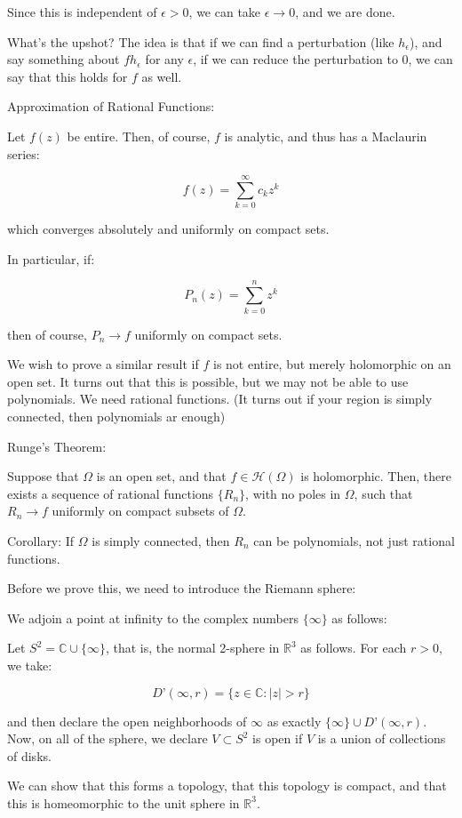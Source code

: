 \documentclass[10pt]{article}
\newcommand{\calH}{\mathcal{H}}
\begin{document}
Since this is independent of $\epsilon > 0$, we can take $\epsilon \to 0$, and we are done. 

What’s the upshot? The idea is that if we can find a perturbation (like $h_\epsilon$), and say something about $f h_\epsilon$ for any $\epsilon$, if we can reduce the perturbation to 0, we can say that this holds for $f$ as well. 

Approximation of Rational Functions:

Let $f(z)$ be entire. Then, of course, $f$ is analytic, and thus has a Maclaurin series:

$$f(z) = \sum_{k=0}^\infty c_k z^k$$

which converges absolutely and uniformly on compact sets. 

In particular, if:

$$P_n(z) = \sum_{k=0}^n z^k $$

then of course, $P_n \to f$ uniformly on compact sets. 

We wish to prove a similar result if $f$ is not entire, but merely holomorphic on an open set. It turns out that this is possible, but we may not be able to use polynomials. We need rational functions. (It turns out if your region is simply connected, then polynomials ar enough)

Runge’s Theorem:

Suppose that $\Omega$ is an open set, and that $f \in \calH(\Omega)$ is holomorphic. Then, there exists a sequence of rational functions $\{ R_n \}$, with no poles in $\Omega$, such that $R_n \to f$ uniformly on compact subsets of $\Omega$. 

Corollary: If $\Omega$ is simply connected, then $R_n$ can be polynomials, not just rational functions. 

Before we prove this, we need to introduce the Riemann sphere:

We adjoin a point at infinity to the complex numbers $\{ \infty \}$ as follows:

Let $S^2 = \mathbb{C} \cup \{ \infty \}$, that is, the normal 2-sphere in $\mathbb{R}^3$ as follows. For each $r > 0$, we take:

$$D’(\infty,r) = \{ z \in \mathbb{C} : |z| > r \}$$

and then declare the open neighborhoods of $\infty$ as exactly $\{ \infty \} \cup D’(\infty,r)$. Now, on all of the sphere, we declare $V\subset S^2$ is open if $V$ is a union of collections of disks. 

We can show that this forms a topology, that this topology is compact, and that this is homeomorphic to the unit sphere in $\mathbb{R}^3$. 
\end{document}
